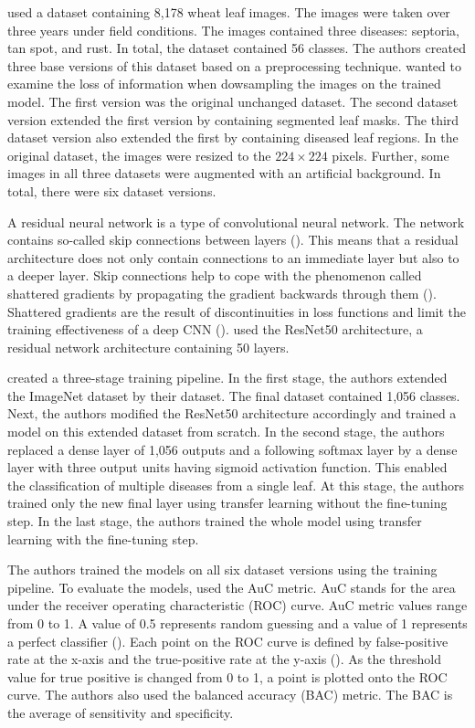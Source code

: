 \documentclass{BachelorBUI}
\begin{document}
        \textcite{Picon:2019} used a dataset containing 8,178 wheat leaf images. The images were taken over three years under field conditions. The images contained three diseases: septoria, tan spot, and rust. In total, the dataset contained 56 classes. The authors created three base versions of this dataset based on a preprocessing technique. \textcite{Picon:2019} wanted to examine the loss of information when dowsampling the images on the trained model. The first version was the original unchanged dataset. The second dataset version extended the first version by containing segmented leaf masks. The third dataset version also extended the first by containing diseased leaf regions. In the original dataset, the images were resized to the $224 \times 224$ pixels. Further, some images in all three datasets were augmented with an artificial background. In total, there were six dataset versions.

        A residual neural network is a type of convolutional neural network. The network contains so-called skip connections between layers (\cite{Aggarwal:2018}). This means that a residual architecture does not only contain connections to an immediate layer but also to a deeper layer. Skip connections help to cope with the phenomenon called shattered gradients by propagating the gradient backwards through them (\cite{Bishop:2024}). Shattered gradients are the result of discontinuities in loss functions and limit the training effectiveness of a deep CNN (\cite{Bishop:2024}). \textcite{Picon:2019} used the ResNet50 architecture, a residual network architecture containing 50 layers.

        \textcite{Picon:2019} created a three-stage training pipeline. In the first stage, the authors extended the ImageNet dataset by their dataset. The final dataset contained 1,056 classes. Next, the authors modified the ResNet50 architecture accordingly and trained a model on this extended dataset from scratch. In the second stage, the authors replaced a dense layer of 1,056 outputs and a following softmax layer by a dense layer with three output units having sigmoid activation function. This enabled the classification of multiple diseases from a single leaf. At this stage, the authors trained only the new final layer using transfer learning without the fine-tuning step. In the last stage, the authors trained the whole model using transfer learning with the fine-tuning step.

        The authors trained the models on all six dataset versions using the training pipeline. To evaluate the models, \textcite{Picon:2019} used the AuC metric. AuC stands for the area under the receiver operating characteristic (ROC) curve. AuC metric values range from 0 to 1. A value of 0.5 represents random guessing and a value of 1 represents a perfect classifier (\cite{Bishop:2024}). Each point on the ROC curve is defined by false-positive rate at the x-axis and the true-positive rate at the y-axis (\cite{Murphy:2022}). As the threshold value for true positive is changed from 0 to 1, a point is plotted onto the ROC curve. The authors also used the balanced accuracy (BAC) metric. The BAC is the average of sensitivity and specificity.
\end{document}

